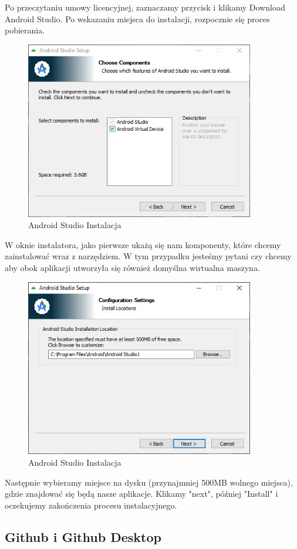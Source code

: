 Po przeczytaniu umowy licencyjnej, zaznaczamy przycisk i klikamy Download Android Studio. Po wskazaniu miejsca do instalacji, rozpocznie się proces pobierania.
\newpage
\begin{figure}[!hbt]
	\begin{center}
		\includegraphics[width=10cm]{rys/InsAndr/1.png}
		\caption{Android Studio Instalacja}
		\label{rys:Android-studio-instalacja1}
	\end{center}
\end{figure}
W oknie instalatora, jako pierwsze ukażą się nam komponenty, które chcemy zainstalować wraz z narzędziem. W tym przypadku jesteśmy pytani czy chcemy aby obok aplikacji utworzyła się również domyślna wirtualna maszyna.

\begin{figure}[!hbt]
	\begin{center}
		\includegraphics[width=10cm]{rys/InsAndr/2.png}
		\caption{Android Studio Instalacja}
		\label{rys:Android-studio-instalacja2}
	\end{center}
\end{figure}

Następnie wybieramy miejsce na dysku (przynajmniej 500MB wolnego miejsca), gdzie znajdować się będą nasze aplikacje. Klikamy "next", później "Install" i oczekujemy zakończenia procesu instalacyjnego.

\subsection{Github i Github Desktop}